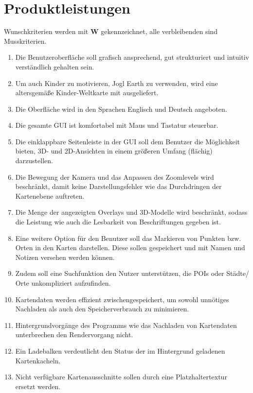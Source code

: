 \documentclass[10pt]{scrreprt}
\newcommand{\sfbf}[1]{\textbf{\sffamily #1}}
\newcommand{\W}{\sfbf{W}}
\newcommand{\ziel}[1]{{\fontsize{9.5}{11}\textsf{/#1/}}}
\newcommand{\ziellabel}{Z}
\newcommand{\muss}{\renewcommand{\labelenumi}{\textbf{\ziel{\ziellabel\numprint{\theenumi}0}}}}
\newcommand{\wunsch}{\renewcommand{\labelenumi}{\textbf{\ziel{\ziellabel\numprint{\theenumi}0W}}}}
\begin{document}
\chapter{Produktleistungen}

\renewcommand{\ziellabel}{L}
\muss

Wunschkriterien werden mit {\W } gekennzeichnet, alle verbleibenden sind Musskriterien.

\begin{enumerate}[leftmargin=2.2cm]
\item Die Benutzeroberfläche soll grafisch ansprechend, gut strukturiert und intuitiv verständlich gehalten sein.
\wunsch
\item Um auch Kinder zu motivieren, Jogl Earth zu verwenden, wird eine altersgemäße Kinder-Weltkarte mit ausgeliefert.
\muss
\item Die Oberfläche wird in den Sprachen Englisch und Deutsch angeboten.
\item Die gesamte GUI ist komfortabel mit Maus und Tastatur steuerbar.
\item Die einklappbare Seitenleiste in der GUI soll dem Benutzer die Möglichkeit bieten, 3D- und 2D-Ansichten in einem größeren Umfang (flächig) darzustellen.
\item Die Bewegung der Kamera und das Anpassen des Zoomlevels wird beschränkt, damit keine Darstellungsfehler wie das Durchdringen der Kartenebene auftreten.
\item Die Menge der angezeigten Overlays und 3D-Modelle wird beschränkt, sodass die Leistung wie auch die Lesbarkeit von Beschriftungen gegeben ist.
\item Eine weitere Option für den Benutzer soll das Markieren von Punkten bzw. Orten in den Karten darstellen. Diese sollen gespeichert und mit Namen und Notizen versehen werden können.
\item Zudem soll eine Suchfunktion den Nutzer unterstützen, die POIs oder Städte/ Orte unkompliziert aufzufinden.
\item Kartendaten werden effizient zwischengespeichert, um sowohl unnötiges Nachladen als auch den Speicherverbrauch zu minimieren.
\item Hintergrundvorgänge des Programms wie das Nachladen von Kartendaten unterbrechen den Rendervorgang nicht.
\item Ein Ladebalken verdeutlicht den Status der im Hintergrund geladenen Kartenkacheln.
\wunsch
\item Nicht verfügbare Kartenausschnitte sollen durch eine Platzhaltertextur ersetzt werden.

\end{enumerate}
\end{document}
